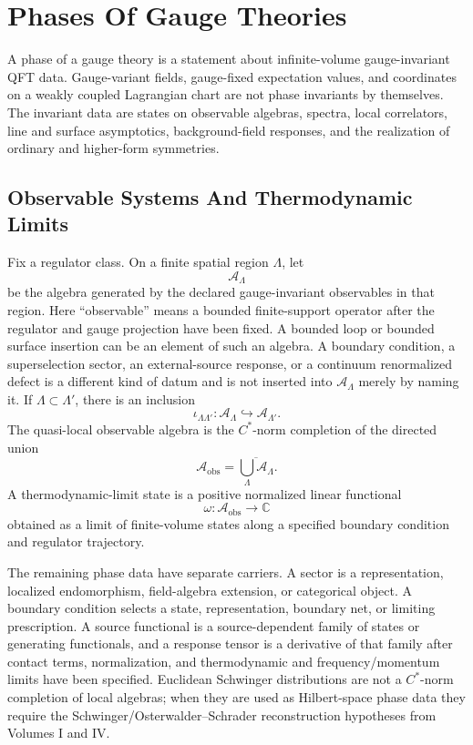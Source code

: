 \chapter{Phases Of Gauge Theories}
\label{ch:global-phases-of-gauge-theories}

\ConventionsMixed

A phase of a gauge theory is a statement about infinite-volume
gauge-invariant QFT data.  Gauge-variant fields, gauge-fixed expectation
values, and coordinates on a weakly coupled Lagrangian chart are not phase
invariants by themselves.  The invariant data are states on observable
algebras, spectra, local correlators, line and surface asymptotics,
background-field responses, and the realization of ordinary and higher-form
symmetries.

\section{Observable Systems And Thermodynamic Limits}

Fix a regulator class.  On a finite spatial region \(\Lambda\), let
\[
  \mathcal A_\Lambda
\]
be the algebra generated by the declared gauge-invariant observables in that
region.  Here ``observable'' means a bounded finite-support operator after the
regulator and gauge projection have been fixed.  A bounded loop or bounded
surface insertion can be an element of such an algebra.  A boundary condition,
a superselection sector, an external-source response, or a continuum
renormalized defect is a different kind of datum and is not inserted into
\(\mathcal A_\Lambda\) merely by naming it.  If \(\Lambda\subset\Lambda'\),
there is an inclusion
\[
  \iota_{\Lambda\Lambda'}:\mathcal A_\Lambda\hookrightarrow\mathcal A_{\Lambda'}.
\]
The quasi-local observable algebra is the \(C^*\)-norm completion of the
directed union
\[
  \mathcal A_{\mathrm{obs}}
  =
  \overline{\bigcup_\Lambda\mathcal A_\Lambda}.
\]
A thermodynamic-limit state is a positive normalized linear functional
\[
  \omega:\mathcal A_{\mathrm{obs}}\longrightarrow\mathbb C
\]
obtained as a limit of finite-volume states along a specified boundary
condition and regulator trajectory.

The remaining phase data have separate carriers.  A sector is a representation,
localized endomorphism, field-algebra extension, or categorical object.  A
boundary condition selects a state, representation, boundary net, or limiting
prescription.  A source functional is a source-dependent family of states or
generating functionals, and a response tensor is a derivative of that family
after contact terms, normalization, and thermodynamic and frequency/momentum
limits have been specified.  Euclidean Schwinger distributions are not a
\(C^*\)-norm completion of local algebras; when they are used as Hilbert-space
phase data they require the Schwinger/Osterwalder--Schrader reconstruction
hypotheses from Volumes I and IV.

